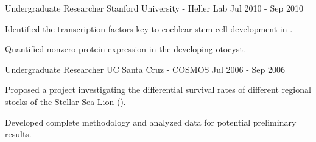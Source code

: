 \begin{cventries}
{\begin{cvitems}
      \end{cvitems}
    }
  \cventry
    {Undergraduate Researcher} %
    {Stanford University - Heller Lab} %
    {} %
    {Jul 2010 - Sep 2010} %
    {
      \begin{cvitems} %
        \item Identified the transcription factors key to cochlear stem cell development in \gal.
        \item Quantified nonzero protein expression in the developing otocyst.
      \end{cvitems}
    }
  \cventry
    {Undergraduate Researcher} %
    {UC Santa Cruz - COSMOS} %
    {} %
    {Jul 2006 - Sep 2006} %
    {
      \begin{cvitems} %
        \item Proposed a project investigating the differential survival rates of different regional stocks of the Stellar Sea Lion (\ejub).
        \item Developed complete methodology and analyzed data for potential preliminary results.
      \end{cvitems}
    }
\fi
\end{cventries}
